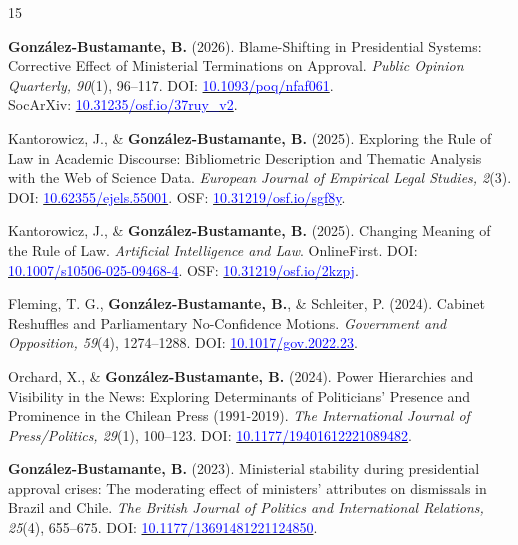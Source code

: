 \begin{publications}
\begin{benumerate}{15}
\item{{\bfseries González-Bustamante, B.} (2026). Blame-Shifting in Presidential Systems: Corrective Effect of Ministerial Terminations on Approval. {\itshape Public Opinion Quarterly, 90}(1), 96--117. DOI: \href{https://doi.org/10.1093/poq/nfaf061}{\textcolor{blue}{10.1093/poq/nfaf061}}. \\ SocArXiv: \href{https://doi.org/10.31235/osf.io/37ruy_v2}{\textcolor{blue}{10.31235/osf.io/37ruy\_v2}}.}\vspace{1mm}

\item{Kantorowicz, J., \& {\bfseries González-Bustamante, B.} (2025). Exploring the Rule of Law in Academic Discourse: Bibliometric Description and Thematic Analysis with the Web of Science Data. {\itshape European Journal of Empirical Legal Studies, 2}(3). DOI: \href{https://doi.org/10.62355/ejels.55001}{\textcolor{blue}{10.62355/ejels.55001}}. OSF: \href{https://doi.org/10.31219/osf.io/sgf8y}{\textcolor{blue}{10.31219/osf.io/sgf8y}}.}\vspace{1mm}

\item{Kantorowicz, J., \& {\bfseries González-Bustamante, B.} (2025). Changing Meaning of the Rule of Law. {\itshape Artificial Intelligence and Law}. OnlineFirst. DOI: \href{https://doi.org/10.1007/s10506-025-09468-4}{\textcolor{blue}{10.1007/s10506-025-09468-4}}. OSF: \href{https://doi.org/10.31219/osf.io/2kzpj}{\textcolor{blue}{10.31219/osf.io/2kzpj}}.}\vspace{1mm}

\item{Fleming, T. G., {\bfseries González-Bustamante, B.}, \& Schleiter, P. (2024). Cabinet Reshuffles and Parliamentary No-Confidence Motions. {\itshape Government and Opposition, 59}(4), 1274--1288. DOI: \href{https://doi.org/10.1017/gov.2022.23}{\textcolor{blue}{10.1017/gov.2022.23}}.}\vspace{1mm}

\item{Orchard, X., \& {\bfseries González-Bustamante, B.} (2024). Power Hierarchies and Visibility in the News: Exploring Determinants of Politicians’ Presence and Prominence in the Chilean Press (1991-2019). {\itshape The International Journal of Press/Politics, 29}(1), 100--123. DOI: \href{https://doi.org/10.1177/19401612221089482}{\textcolor{blue}{10.1177/19401612221089482}}.}\vspace{1mm}

\item{{\bfseries González-Bustamante, B.} (2023). Ministerial stability during presidential approval crises: The moderating effect of ministers' attributes on dismissals in Brazil and Chile. {\itshape The British Journal of Politics and International Relations, 25}(4), 655--675. DOI: \href{https://doi.org/10.1177/13691481221124850}{\textcolor{blue}{10.1177/13691481221124850}}.}\vspace{1mm}


\end{benumerate}
\end{publications}
